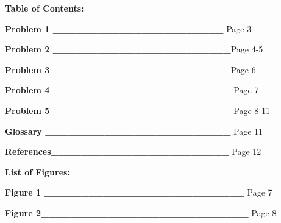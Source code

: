 \documentclass[12pt]{article}
\begin{document}
\vspace{\baselineskip}

\vspace{\baselineskip}

\vspace{\baselineskip}

\vspace{\baselineskip}

\vspace{\baselineskip}

\vspace{\baselineskip}
\textbf{Table of Contents:}\par

\textbf{Problem 1 \_\_\_\_\_\_\_\_\_\_\_\_\_\_\_\_\_\_\_\_\_\_\_ }Page 3\par

\textbf{Problem 2 \_\_\_\_\_\_\_\_\_\_\_\_\_\_\_\_\_\_\_\_\_\_\_\_}Page 4-5\par

\textbf{Problem 3 \_\_\_\_\_\_\_\_\_\_\_\_\_\_\_\_\_\_\_\_\_\_\_\_}Page 6 \par

\textbf{Problem 4 \_\_\_\_\_\_\_\_\_\_\_\_\_\_\_\_\_\_\_\_\_\_\_\_ }Page 7\par

\textbf{Problem 5 \_\_\_\_\_\_\_\_\_\_\_\_\_\_\_\_\_\_\_\_\_\_\_\_ }Page 8-11\par

\textbf{Glossary \_\_\_\_\_\_\_\_\_\_\_\_\_\_\_\_\_\_\_\_\_\_\_\_\_ }Page 11\par

\textbf{References\_\_\_\_\_\_\_\_\_\_\_\_\_\_\_\_\_\_\_\_\_\_\_\_ }Page 12\par


\vspace{\baselineskip}

\vspace{\baselineskip}

\vspace{\baselineskip}

\vspace{\baselineskip}
\textbf{List of Figures:}\par

\textbf{Figure 1 \_\_\_\_\_\_\_\_\_\_\_\_\_\_\_\_\_\_\_\_\_\_\_\_\_\_\_ }Page 7\par

\textbf{Figure 2\_\_\_\_\_\_\_\_\_\_\_\_\_\_\_\_\_\_\_\_\_\_\_\_\_\_\_\_ }Page 8\par
\end{document}
